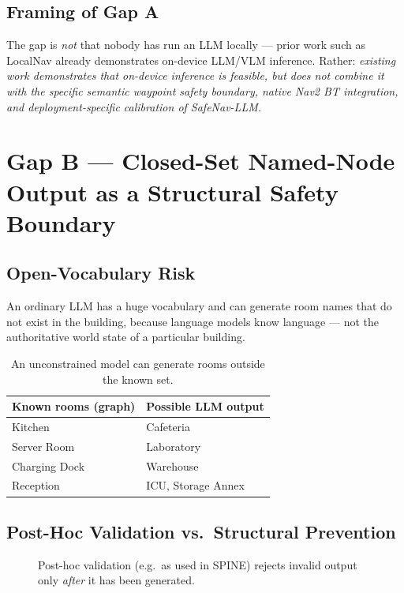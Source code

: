 \documentclass[11pt,a4paper]{article}
\newcommand{\gapbox}[2]{%
  \begin{tcolorbox}[colback=softblue,colframe=navyblue,title={#1},fonttitle=\bfseries,breakable]
  #2
  \end{tcolorbox}%
}
\begin{document}
\subsection{Framing of Gap A}
\gapbox{What Gap A actually means}{
The gap is \emph{not} that nobody has run an LLM locally --- prior work such as
LocalNav already demonstrates on-device LLM/VLM inference. Rather:
\emph{existing work demonstrates that on-device inference is feasible, but does
not combine it with the specific semantic waypoint safety boundary, native
Nav2 BT integration, and deployment-specific calibration of SafeNav-LLM.}
}

\section{Gap B --- Closed-Set Named-Node Output as a Structural Safety Boundary}
\label{sec:gapb}

\subsection{Open-Vocabulary Risk}

An ordinary LLM has a huge vocabulary and can generate room names that do not
exist in the building, because language models know language --- not the
authoritative world state of a particular building.

\begin{table}[h]
\centering
\begin{tabular}{ll}
\toprule
\textbf{Known rooms (graph)} & \textbf{Possible LLM output} \\
\midrule
Kitchen & Cafeteria \\
Server Room & Laboratory \\
Charging Dock & Warehouse \\
Reception & ICU, Storage Annex \\
\bottomrule
\end{tabular}
\caption{An unconstrained model can generate rooms outside the known set.}
\end{table}

\subsection{Post-Hoc Validation vs.\ Structural Prevention}

\begin{figure}[h]
\centering
{}
\caption{Post-hoc validation (e.g.\ as used in SPINE) rejects invalid output only \emph{after} it has been generated.}
\end{figure}
\end{document}
